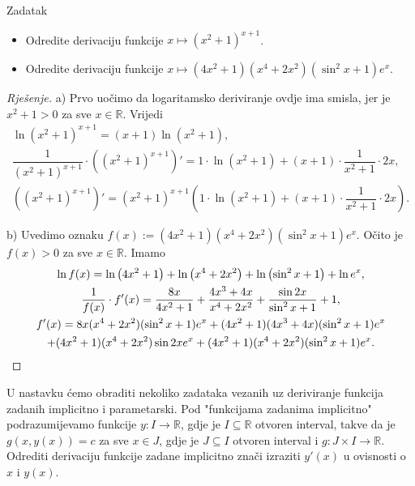 \begin{exercise}{Zadatak} \textbf{}
\begin{itemize}
\item[a)] Odredite derivaciju funkcije $x\mapsto (x^2+1)^{x+1}$.
\item[b)] Odredite derivaciju funkcije $x\mapsto (4x^2+1)(x^4+2x^2)(\sin^2{x}+1)e^x$.
\end{itemize}
\end{exercise}
\begin{proof}[Rješenje]
a) Prvo uočimo da logaritamsko deriviranje ovdje ima smisla, jer je $x^2+1>0$ za sve $x\in \mathbb{R}$. Vrijedi
\begin{gather*}
\ln{(x^2+1)^{x+1}}=(x+1)\ln{\left( x^2+1\right)},\\
\dfrac{1}{(x^2+1)^{x+1}}\cdot \left((x^2+1)^{x+1}\right)'=1\cdot \ln{\left(x^2+1\right)}+(x+1)\cdot \dfrac{1}{x^2+1}\cdot 2x,\\
\left((x^2+1)^{x+1}\right)'=(x^2+1)^{x+1}\left(1\cdot \ln{\left(x^2+1\right)}+(x+1)\cdot \dfrac{1}{x^2+1}\cdot 2x\right).
\end{gather*}

b) Uvedimo oznaku $f(x):=(4x^2+1)(x^4+2x^2)(\sin^2{x}+1)e^x$. Očito je $f(x)>0$ za sve $x\in \mathbb{R}$. Imamo
\begin{gather*}
\ln{f(x)}=\ln{\left(4x^2+1\right)}+\ln{\left(x^4+2x^2\right)}+\ln{\left(\sin^2{x}+1\right)}+\ln{e^x},\\
\dfrac{1}{f(x)}\cdot f'(x)=\dfrac{8x}{4x^2+1}+\dfrac{4x^3+4x}{x^4+2x^2}+\dfrac{\sin{2x}}{\sin^2{x}+1}+1,\\
f'(x)=8x(x^4+2x^2)(\sin^2{x}+1)e^x+(4x^2+1)(4x^3+4x)(\sin^2{x}+1)e^x\\
+(4x^2+1)(x^4+2x^2)\sin{2x}e^x+(4x^2+1)(x^4+2x^2)(\sin^2{x}+1)e^x. \qedhere
\end{gather*}
\end{proof}
U nastavku ćemo obraditi nekoliko zadataka vezanih uz deriviranje funkcija zadanih implicitno i parametarski. Pod "funkcijama zadanima implicitno" podrazumijevamo funkcije $y : I\to \mathbb{R}$, gdje je $I\subseteq \mathbb{R}$ otvoren interval, takve da je $g\left(x, y(x)\right)=c$ za sve $x\in J$, gdje je $J\subseteq I$ otvoren interval i $g : J\times I\to \mathbb{R}$. Odrediti derivaciju funkcije zadane implicitno znači izraziti $y'(x)$ u ovisnosti o $x$ i $y(x)$.

